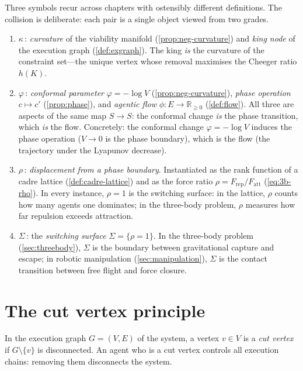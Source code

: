 \begin{remark}\label{rem:notation-unification}
\textcolor{sword}{Three symbols recur across chapters with
ostensibly different definitions.  The collision is deliberate:
each pair is a single object viewed from two grades.}
\begin{enumerate}
  \item $\kappa$\,: \emph{curvature} of the viability manifold
    (\cref{prop:neg-curvature}) and \emph{king node} of the execution
    graph (\cref{def:exgraph}).  The king \emph{is} the curvature
    of the constraint set---the unique vertex whose removal
    maximises the Cheeger ratio $h(K)$.
  \item $\varphi$\,: \emph{conformal parameter}
    $\varphi = -\log V$ (\cref{prop:neg-curvature}), \emph{phase
    operation} $c \mapsto c'$ (\cref{prop:phase}), and
    \emph{agentic flow} $\phi\colon E \to \mathbb{R}_{\geq 0}$
    (\cref{def:flow}).  All three are aspects of the same map
    $S \to S$: the conformal change \emph{is} the phase
    transition, which \emph{is} the flow.  Concretely: the
    conformal change $\varphi = -\log V$ induces the phase
    operation ($V \to 0$ is the phase boundary), which is the
    flow (the trajectory under the Lyapunov decrease).
  \item $\rho$\,: \emph{displacement from a phase boundary}.
    Instantiated as the rank function of a cadre lattice
    (\cref{def:cadre-lattice}) and as the force ratio
    $\rho = F_{\mathrm{rep}}/F_{\mathrm{att}}$
    (\cref{eq:3b-rho}).  In every instance, $\rho = 1$ is
    the switching surface: in the lattice, $\rho$ counts how
    many agents one dominates; in the three-body problem,
    $\rho$ measures how far repulsion exceeds attraction.
  \item $\Sigma$\,: the \emph{switching surface}
    $\Sigma = \{\rho = 1\}$.  In the three-body problem
    (\cref{sec:threebody}), $\Sigma$ is the boundary between
    gravitational capture and escape; in robotic manipulation
    (\cref{sec:manipulation}), $\Sigma$ is the contact
    transition between free flight and force closure.
\end{enumerate}
\end{remark}

\section{The cut vertex principle}\label{sec:cutvertex}

\begin{definition}\label{def:cutvertex}
In the execution graph $G = (V, E)$ of the system, a vertex
$v \in V$ is a \emph{cut vertex} if $G \setminus \{v\}$ is
disconnected. An agent who is a cut vertex controls all execution
chains: removing them disconnects the system.
\end{definition}


